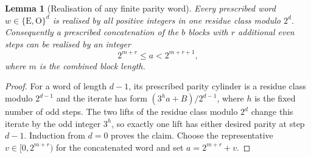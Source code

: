 \documentclass[11pt,a4paper]{article}
\newtheorem{lemma}[theorem]{Lemma}
\begin{document}
\begin{lemma}[Realisation of any finite parity word]\label{lem:realisability}
Every prescribed word $w\in\{\mathrm E,\mathrm O\}^d$ is realised
by all positive integers in one residue class modulo $2^d$.
Consequently a prescribed concatenation of the $b$ blocks with
$r$ additional even steps can be realised by an integer
\[
 2^{m+r}\le a<2^{m+r+1},
\]
where $m$ is the combined block length.
\end{lemma}
\begin{proof}
For a word of length $d-1$, its prescribed parity cylinder is a
residue class modulo $2^{d-1}$ and the iterate has form
$(3^h a+B)/2^{d-1}$, where $h$ is the fixed number of odd steps.
The two lifts of the residue class modulo $2^d$ change this
iterate by the odd integer $3^h$, so exactly one lift has either
desired parity at step $d-1$. Induction from $d=0$ proves the
claim. Choose the representative $v\in[0,2^{m+r})$ for the
concatenated word and set $a=2^{m+r}+v$.
\end{proof}
\end{document}
